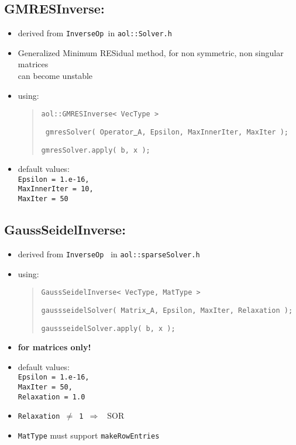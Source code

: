 \subsection{ GMRESInverse: }
\begin{itemize}
\item derived from \texttt{InverseOp }in \texttt{aol::Solver.h}
\item  Generalized Minimum RESidual method, for non symmetric, non singular matrices\\
can become unstable
\item using: \begin{quote}
\texttt{aol::GMRESInverse< VecType > }
\begin{flushright} \texttt{ gmresSolver( Operator\underline{ }A, Epsilon, MaxInnerIter, MaxIter );} \end{flushright}
\texttt{gmresSolver.apply( b, x );}
\end{quote}
\item default values: \\
\texttt{Epsilon = 1.e-16, \\ MaxInnerIter = 10, \\ MaxIter = 50}
\end{itemize}



\subsection{ GaussSeidelInverse: }
\begin{itemize}
\item derived from \texttt{InverseOp } in \texttt{aol::sparseSolver.h}
\item using: \begin{quote}
\texttt{GaussSeidelInverse< VecType, MatType > }
\begin{flushright} \texttt{gaussseidelSolver( Matrix\underline{ }A, Epsilon, MaxIter, Relaxation  );}
\end{flushright}
\texttt{gaussseidelSolver.apply( b, x );}
\end{quote}
\item \textbf{for matrices only!}
\item default values: \\
\texttt{Epsilon = 1.e-16, \\ MaxIter = 50, \\ Relaxation = 1.0}
\item \texttt{Relaxation $\not=$ 1 $\Rightarrow$ } SOR
\item \texttt{MatType} must support \texttt{makeRowEntries }
\end{itemize}

